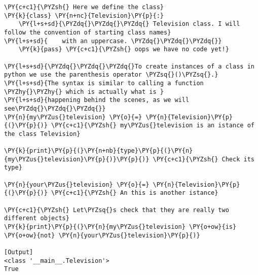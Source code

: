 \begin{Verbatim}[label=\makebox{\url{https://bitbucket.org/lbaldini/programming/src/tip/snippets/class\_tv\_basic.py}},commandchars=\\\{\}]
\PY{c+c1}{\PYZsh{} Here we define the class}
\PY{k}{class} \PY{n+nc}{Television}\PY{p}{:}
    \PY{l+s+sd}{\PYZdq{}\PYZdq{}\PYZdq{} Television class. I will follow the convention of starting class names}
\PY{l+s+sd}{    with an uppercase. \PYZdq{}\PYZdq{}\PYZdq{}}
    \PY{k}{pass} \PY{c+c1}{\PYZsh{} oops we have no code yet!}

\PY{l+s+sd}{\PYZdq{}\PYZdq{}\PYZdq{}To create instances of a class in python we use the parenthesis operator \PYZsq{}()\PYZsq{}.}
\PY{l+s+sd}{The syntax is similar to calling a function \PYZhy{}\PYZhy{} which is actually what is }
\PY{l+s+sd}{happening behind the scenes, as we will see\PYZdq{}\PYZdq{}\PYZdq{}}
\PY{n}{my\PYZus{}television} \PY{o}{=} \PY{n}{Television}\PY{p}{(}\PY{p}{)} \PY{c+c1}{\PYZsh{} my\PYZus{}television is an istance of the class Television}

\PY{k}{print}\PY{p}{(}\PY{n+nb}{type}\PY{p}{(}\PY{n}{my\PYZus{}television}\PY{p}{)}\PY{p}{)} \PY{c+c1}{\PYZsh{} Check its type}

\PY{n}{your\PYZus{}television} \PY{o}{=} \PY{n}{Television}\PY{p}{(}\PY{p}{)} \PY{c+c1}{\PYZsh{} An this is another istance}

\PY{c+c1}{\PYZsh{} Let\PYZsq{}s check that they are really two different objects}
\PY{k}{print}\PY{p}{(}\PY{n}{my\PYZus{}television} \PY{o+ow}{is} \PY{o+ow}{not} \PY{n}{your\PYZus{}television}\PY{p}{)}

[Output]
<class '__main__.Television'>
True
\end{Verbatim}